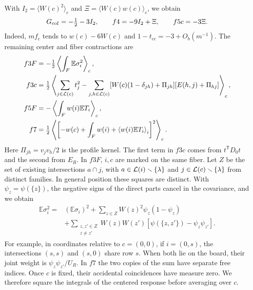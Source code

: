 With \(I_2=\langle W(c)^2\rangle_c\) and \(\Xi=\langle W(c)w(c)\rangle_c\), we obtain \[
 G_{\rm cof}=-\tfrac12-3I_2,\qquad f4=-9I_2+\Xi,\qquad f5c=-3\Xi .
\] Indeed, \(mf_c\) tends to \(w(c)-6W(c)\) and \(1-t_{cc}=-3+O_b(m^{-1})\). The remaining center and
fiber contractions are \begin{align*}
 f3F&=-\tfrac12\left\langle\int_F\mathbb E\sigma_i^2\right\rangle_c,\\
 f3c&=\tfrac12\left\langle\sum_{j\in \mathcal L(c)}t_j^2
 -\sum_{j,h\in \mathcal L(c)}[W(c)(1-\delta_{jh})+\Pi_{jh}]
                         [E(h,j)+\Pi_{hj}]\right\rangle_c,\\
 f5F&=-\left\langle\int_F w(i)\mathbb E T_i\right\rangle_c,\\
 f7&=\tfrac12\left\langle\left[-w(c)+\int_F w(i)
                  +\left\langle w(i)\mathbb E T_i\right\rangle_i\right]^2\right\rangle_c .
\end{align*} Here \(\Pi_{jh}=v_jv_h/2\) is the profile kernel. The first term in \(f3c\) comes from
\(t^{\mathsf T}D_0t\) and the second from \(E_R\). In \(f3F\), \(i,c\) are marked on the same fiber. Let
\(Z\) be the set of existing intersections \(a\cap j\), with \(a\in \mathcal L(i)\smallsetminus\{\lambda\}\)
and \(j\in \mathcal L(c)\smallsetminus\{\lambda\}\) from distinct families. In general position these squares
are distinct. With \(\psi_z=\psi(\{z\})\), the negative signs of the direct parts cancel in the
covariance, and we obtain \begin{align*}
 \mathbb E\sigma_i^2={}&(\mathbb E\sigma_i)^2+\sum_{z\in Z}W(z)^2\psi_z(1-\psi_z)\\
 &+\sum_{\substack{z,z'\in Z\\z\ne z'}}W(z)W(z')
       [\psi(\{z,z'\})-\psi_z\psi_{z'}].
\end{align*} For example, in coordinates relative to \(c=(0,0)\), if \(i=(0,s)\), the intersections
\((s,s)\) and \((s,0)\) share row \(s\). When both lie on the board, their joint weight is
\(\psi_z\psi_{z'}/U_R\). In \(f7\) the two copies of the sum have separate free indices. Once \(c\) is
fixed, their accidental coincidences have measure zero. We therefore square the integrals of the centered
response before averaging over \(c\).

